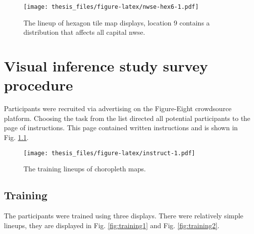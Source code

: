 \documentclass{monashthesis}
\begin{document}
\begin{figure}
\centering
\texttt{[image: thesis\_files/figure-latex/nwse-hex6-1.pdf]}
\caption{\label{fig:nwse-hex6}The lineup of hexagon tile map displays, location 9 contains a distribution that affects all capital nwse.}
\end{figure}

\hypertarget{visual-inference-study-survey-procedure}{%
\chapter{Visual inference study survey procedure}\label{visual-inference-study-survey-procedure}}

Participants were recruited via advertising on the Figure-Eight crowdsource platform.
Choosing the task from the list directed all potential participants to the page of instructions.
This page contained written instructions and is shown in Fig. \ref{fig:instruct}.

\begin{Shaded}
\begin{Highlighting}[]
\NormalTok{() }\OperatorTok{+}
\StringTok{  }\OperatorTok{::}\NormalTok{(}\NormalTok{(}\NormalTok{)))}
\end{Highlighting}
\end{Shaded}

\begin{figure}
\centering
\texttt{[image: thesis\_files/figure-latex/instruct-1.pdf]}
\caption{\label{fig:instruct}The training lineups of choropleth maps.}
\end{figure}

\hypertarget{training}{%
\section{Training}\label{training}}

The participants were trained using three displays. There were relatively simple lineups, they are displayed in Fig. \ref{fig:training1} and Fig. \ref{fig:training2}.

\begin{Shaded}
\begin{Highlighting}[]
\NormalTok{() }\OperatorTok{+}
\StringTok{  }\OperatorTok{::}\NormalTok{(}\NormalTok{(}\NormalTok{)))}
\end{Highlighting}
\end{Shaded}
\end{document}
